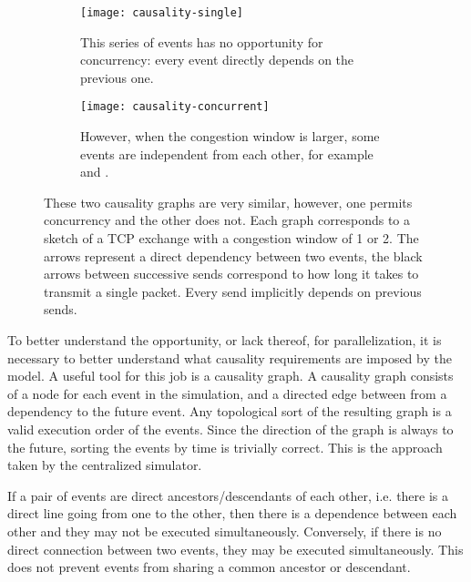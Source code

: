 \begin{figure}
    \centering
    \begin{subfigure}[t]{0.45\textwidth}
        \centering
        \texttt{[image: causality-single]}
        \caption{
            This series of events has no opportunity for concurrency: every event directly depends on the previous one.
        }
        \label{causality-graph-seq:fig}
    \end{subfigure}
    \begin{subfigure}[t]{0.45\textwidth}
        \centering
        \texttt{[image: causality-concurrent]}
        \caption{
            However, when the congestion window is larger, some events are independent from each other, for example  and .
        }
        \label{causality-graph-seq:fig}
    \end{subfigure}
    \caption{
        These two causality graphs are very similar, however, one permits concurrency and the other does not.
        Each graph corresponds to a sketch of a TCP exchange with a congestion window of 1 or 2.
        The arrows represent a direct dependency between two events, the black arrows between successive sends correspond to how long it takes to transmit a single packet.
        Every send implicitly depends on previous sends.
    }
    \label{causality-graph:fig}
\end{figure}

To better understand the opportunity, or lack thereof, for parallelization, it is necessary to better understand what causality requirements are imposed by the model.
A useful tool for this job is a causality graph.
A causality graph consists of a node for each event in the simulation, and a directed edge between from a dependency to the future event.
Any topological sort of the resulting graph is a valid execution order of the events.
Since the direction of the graph is always to the future, sorting the events by time is trivially correct.
This is the approach taken by the centralized simulator.

If a pair of events are direct ancestors/descendants of each other, i.e. there is a direct line going from one to the other, then there is a dependence between each other and they may not be executed simultaneously.
Conversely, if there is no direct connection between two events, they may be executed simultaneously.
This does not prevent events from sharing a common ancestor or descendant.

